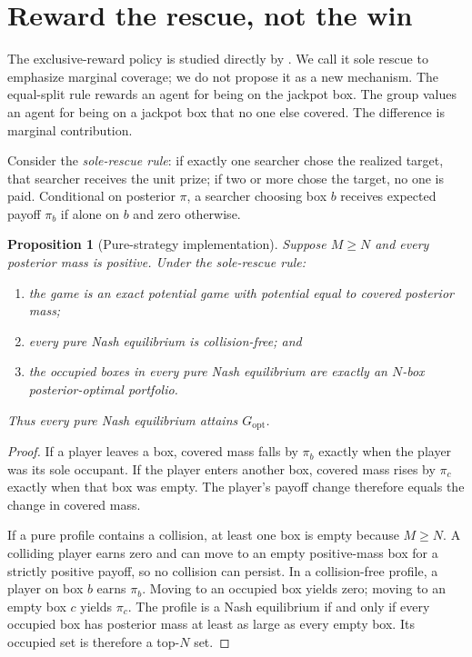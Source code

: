 \documentclass[11pt]{article}
\newtheorem{proposition}{Proposition}
\theoremstyle{definition}
\theoremstyle{remark}
\newcommand{\1}{\mathbf{1}}
\newcommand{\opt}{\mathrm{opt}}
\begin{document}
\section{Reward the rescue, not the win}
\label{sec:mechanism}

The exclusive-reward policy is studied directly by \citet{ColletKorman2018,KormanRodeh2020}. We call it sole rescue to emphasize marginal coverage; we do not propose it as a new mechanism. The equal-split rule rewards an agent for being on the jackpot box. The group values an agent for being on a jackpot box that no one else covered. The difference is marginal contribution.

Consider the \emph{sole-rescue rule}: if exactly one searcher chose the realized target, that searcher receives the unit prize; if two or more chose the target, no one is paid. Conditional on posterior $\pi$, a searcher choosing box $b$ receives expected payoff $\pi_b$ if alone on $b$ and zero otherwise.

\begin{proposition}[Pure-strategy implementation]
Suppose $M\ge N$ and every posterior mass is positive. Under the sole-rescue rule:
\begin{enumerate}[label=(\roman*)]
\item the game is an exact potential game with potential equal to covered posterior mass;
\item every pure Nash equilibrium is collision-free; and
\item the occupied boxes in every pure Nash equilibrium are exactly an $N$-box posterior-optimal portfolio.
\end{enumerate}
Thus every pure Nash equilibrium attains $G_{\opt}$.
\end{proposition}

\begin{proof}
If a player leaves a box, covered mass falls by $\pi_b$ exactly when the player was its sole occupant. If the player enters another box, covered mass rises by $\pi_c$ exactly when that box was empty. The player's payoff change therefore equals the change in covered mass.

If a pure profile contains a collision, at least one box is empty because $M\ge N$. A colliding player earns zero and can move to an empty positive-mass box for a strictly positive payoff, so no collision can persist. In a collision-free profile, a player on box $b$ earns $\pi_b$. Moving to an occupied box yields zero; moving to an empty box $c$ yields $\pi_c$. The profile is a Nash equilibrium if and only if every occupied box has posterior mass at least as large as every empty box. Its occupied set is therefore a top-$N$ set.
\end{proof}
\end{document}
